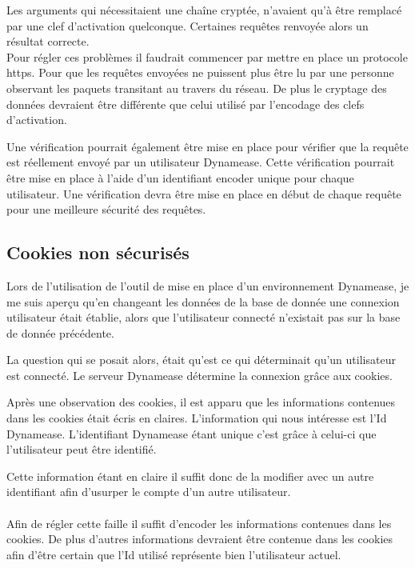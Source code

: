 Les arguments qui nécessitaient une chaîne cryptée, n'avaient qu'à être remplacé par une clef d'activation quelconque. Certaines requêtes renvoyée alors un résultat correcte.\\

Pour régler ces problèmes il faudrait commencer par mettre en place un protocole https. Pour que les requêtes envoyées ne puissent plus être lu par une personne observant les paquets transitant au travers du réseau. De plus le cryptage des données devraient être différente que celui utilisé par l'encodage des clefs d'activation.

Une vérification pourrait également être mise en place pour vérifier que la requête est réellement envoyé par un utilisateur Dynamease. Cette vérification pourrait être mise en place à l'aide d'un identifiant encoder unique pour chaque utilisateur. Une vérification devra être mise en place en début de chaque requête pour une meilleure sécurité des requêtes.

\subsection{Cookies non sécurisés}

Lors de l'utilisation de l'outil de mise en place d'un environnement Dynamease, je me suis aperçu qu'en changeant les données de la base de donnée une connexion utilisateur était établie, alors que l'utilisateur connecté n'existait pas sur la base de donnée précédente.

La question qui se posait alors, était qu'est ce qui déterminait qu'un utilisateur est connecté. Le serveur Dynamease détermine la connexion grâce aux cookies.

Après une observation des cookies, il est apparu que les informations contenues dans les cookies était écris en claires. L'information qui nous intéresse est l'Id Dynamease. L'identifiant Dynamease étant unique c'est grâce à celui-ci que l'utilisateur peut être identifié.

Cette information étant en claire il suffit donc de la modifier avec un autre identifiant afin d'usurper le compte d'un autre utilisateur.
\\\\

Afin de régler cette faille il suffit d'encoder les informations contenues dans les cookies. De plus d'autres informations devraient être contenue dans les cookies afin d'être certain que l'Id utilisé représente bien l'utilisateur actuel. 

